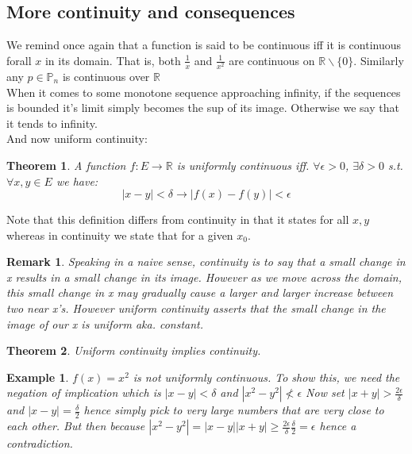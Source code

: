 \documentclass[titlepage]{article}
\newtheorem{remark}{Remark}[section]
\newtheorem{theorem}{Theorem}[section]
\newtheorem{example}{Example}[section]
\begin{document}
\subsection{More continuity and consequences}

We remind once again that a function is said to be continuous iff it is continuous forall $x$ in its domain. That is, both $\frac{1}{x}$ and $\frac{1}{x^{2}}$ are continuous on $\mathbb{R}\backslash\{0\}$. Similarly any $p \in \mathbb{P}_{n}$ is continuous over $\mathbb{R}$
\\

When it comes to some monotone sequence approaching infinity, if the sequences is bounded it's limit simply becomes the sup of its image. Otherwise we say that it tends to infinity. 
\\

And now uniform continuity:
\begin{theorem}
A function $f:E \to \mathbb{R}$ is uniformly continuous iff. $\forall \epsilon > 0$, $\exists \delta > 0$ s.t. $\forall x,y \in E$ we have:
$$|x-y| < \delta \rightarrow |f(x) - f(y)|<\epsilon$$
\end{theorem}
Note that this definition differs from continuity in that it states for all $x,y$ whereas in continuity we state that for a given $x_{0}$. 
\\

\begin{tcolorbox}
\begin{remark}
       Speaking in a naive sense, continuity is to say that a small change in x results in a small change in its image. However as we move across the domain, this small change in x may gradually cause a larger and larger increase between two near x's. However uniform continuity asserts that the small change in the image of our x is uniform aka. constant. 
\end{remark}
\end{tcolorbox}

\begin{theorem}
Uniform continuity implies continuity. 
\end{theorem}

\begin{example}
$f(x) = x^2$ is not uniformly continuous. To show this, we need the negation of implication which is $|x-y|<\delta$ and $|x^{2} - y^{2}|\not<\epsilon$ Now set $|x+y|>\frac{2\epsilon}{\delta}$ and $|x-y| = \frac{\delta}{2}$ hence simply pick to very large numbers that are very close to each other. But then because $|x^2 - y^2| = |x-y||x+y| \geq \frac{2\epsilon}{\delta}\frac{\delta}{2} = \epsilon$ hence a contradiction. 
\end{example}
\end{document}
